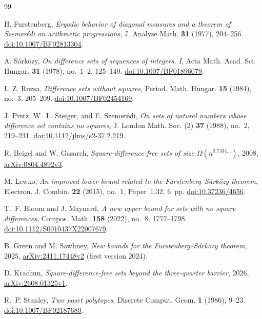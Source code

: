 \documentclass[11pt]{article}
\theoremstyle{definition}
\theoremstyle{remark}
\begin{document}
\begingroup
\raggedright
\begin{thebibliography}{99}

H. Furstenberg,
\emph{Ergodic behavior of diagonal measures and a theorem of
Szemer\'edi on arithmetic progressions},
J. Analyse Math. \textbf{31} (1977), 204--256.
\href{https://doi.org/10.1007/BF02813304}{doi:10.1007/BF02813304}.

A. S\'ark\"ozy,
\emph{On difference sets of sequences of integers. I},
Acta Math. Acad. Sci. Hungar. \textbf{31} (1978), no.~1--2, 125--149.
\href{https://doi.org/10.1007/BF01896079}{doi:10.1007/BF01896079}.

I.~Z. Ruzsa, \emph{Difference sets without squares},
Period. Math. Hungar. \textbf{15} (1984), no.~3, 205--209.
\href{https://doi.org/10.1007/BF02454169}{doi:10.1007/BF02454169}.

J. Pintz, W.~L. Steiger, and E. Szemer\'edi,
\emph{On sets of natural numbers whose difference set contains no squares},
J. London Math. Soc. (2) \textbf{37} (1988), no.~2, 219--231.
\href{https://doi.org/10.1112/jlms/s2-37.2.219}{doi:10.1112/jlms/s2-37.2.219}.

R. Beigel and W. Gasarch,
\emph{Square-difference-free sets of size $\Omega(n^{0.7334\ldots})$},
2008, \href{https://arxiv.org/abs/0804.4892v3}{arXiv:0804.4892v3}.

M. Lewko,
\emph{An improved lower bound related to the
Furstenberg--S\'ark\"ozy theorem},
Electron. J. Combin. \textbf{22} (2015), no.~1, Paper~1.32, 6~pp.
\href{https://doi.org/10.37236/4656}{doi:10.37236/4656}.

T.~F. Bloom and J. Maynard,
\emph{A new upper bound for sets with no square differences},
Compos. Math. \textbf{158} (2022), no.~8, 1777--1798.
\href{https://doi.org/10.1112/S0010437X22007679}{doi:10.1112/S0010437X22007679}.

B. Green and M. Sawhney,
\emph{New bounds for the Furstenberg--S\'ark\"ozy theorem},
2025, \href{https://arxiv.org/abs/2411.17448v2}{arXiv:2411.17448v2}
(first version 2024).

D. Krachun,
\emph{Square-difference-free sets beyond the three-quarter barrier},
2026, \href{https://arxiv.org/abs/2608.01325v1}{arXiv:2608.01325v1}.

R.~P. Stanley,
\emph{Two poset polytopes},
Discrete Comput. Geom. \textbf{1} (1986), 9--23.
\href{https://doi.org/10.1007/BF02187680}{doi:10.1007/BF02187680}.



\end{thebibliography}
\end{document}
